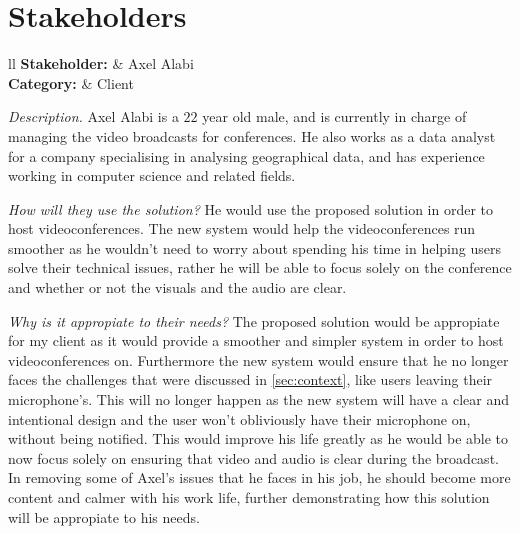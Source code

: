 \section{Stakeholders}

\begin{tblr}{ll}
  \textsf{\bfseries Stakeholder: } & Axel Alabi\\
  \textsf{\bfseries Category: } & Client\\
\end{tblr}
\vspace{0.2cm}

\textit{Description.} %
Axel Alabi is a $22$ year old male, and is currently in charge 
of managing the video broadcasts for conferences. He also
works as a data analyst for a company specialising in analysing
geographical data, and has experience working in computer 
science and related fields. \vspace{0.2cm}

\textit{How will they use the solution?} %
He would use the proposed solution in order to host
videoconferences. The new system would help the 
videoconferences run smoother as he wouldn't need to worry 
about spending his time in helping users solve their technical
issues, rather he will be able to focus solely on the
conference and whether or not the visuals and the audio are
clear. \vspace{0.2cm}

\textit{Why is it appropiate to their needs?} %
The proposed solution would be appropiate for my client as it
would provide a smoother and simpler system in order to host 
videoconferences on. Furthermore the new system would ensure
that he no longer faces the challenges that were discussed
in \ref{sec:context}, like users leaving their microphone's.
This will no longer happen as the new system will have a 
clear and intentional design and the user won't obliviously 
have their microphone on, without being notified. This would 
improve his life greatly as he would be able to now focus 
solely on ensuring that video and audio is clear during the 
broadcast. In removing some of Axel's issues that he faces in
his job, he should become more content and calmer with his
work life, further demonstrating how this solution will be 
appropiate to his needs.

\vspace{0.2cm}

